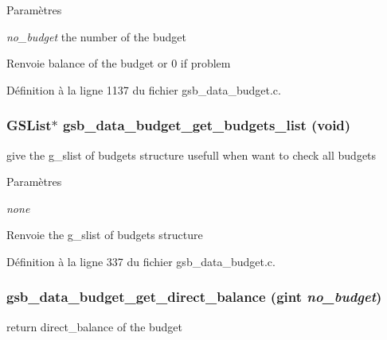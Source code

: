 \begin{DoxyParams}{Paramètres}
\item[{\em no\_\-budget}]the number of the budget\end{DoxyParams}
\begin{DoxyReturn}{Renvoie}
balance of the budget or 0 if problem 
\end{DoxyReturn}


Définition à la ligne 1137 du fichier gsb\_\-data\_\-budget.c.

\subsubsection[{gsb\_\-data\_\-budget\_\-get\_\-budgets\_\-list}]{\setlength{\rightskip}{0pt plus 5cm}GSList$\ast$ gsb\_\-data\_\-budget\_\-get\_\-budgets\_\-list (void)}\label{gsb__data__budget_8c_a5c36c8f11ed3cd9c03a97c89a27fbc5b}
give the g\_\-slist of budgets structure usefull when want to check all budgets


\begin{DoxyParams}{Paramètres}
\item[{\em none}]\end{DoxyParams}
\begin{DoxyReturn}{Renvoie}
the g\_\-slist of budgets structure 
\end{DoxyReturn}


Définition à la ligne 337 du fichier gsb\_\-data\_\-budget.c.

\subsubsection[{gsb\_\-data\_\-budget\_\-get\_\-direct\_\-balance}]{ gsb\_\-data\_\-budget\_\-get\_\-direct\_\-balance (gint {\em no\_\-budget})}\label{gsb__data__budget_8c_a836a45313442b4fcd3e7bb52a031d8c7}
return direct\_\-balance of the budget


